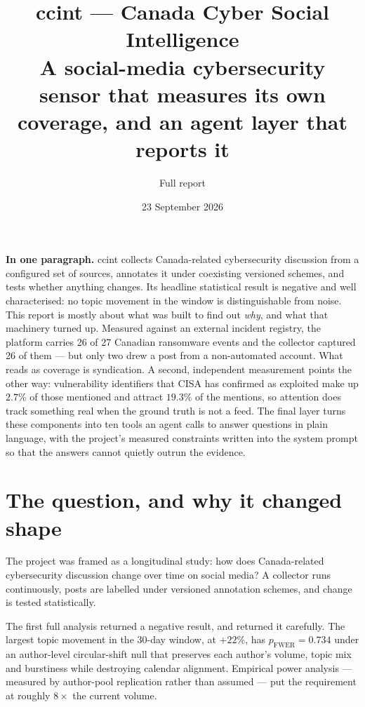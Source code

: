 \documentclass[11pt]{article}
\title{\vspace{-1.6cm}\textbf{\color{accent}ccint --- Canada Cyber Social Intelligence}\\[3pt]
\large\color{ink} A social-media cybersecurity sensor that measures its own
coverage, and an agent layer that reports it}
\author{\normalsize Full report}
\date{\normalsize 23 September 2026}
\begin{document}
\maketitle
\thispagestyle{fancy}
\vspace{-0.7cm}

\begin{keybox}
\textbf{In one paragraph.} ccint collects Canada-related cybersecurity
discussion from a configured set of sources, annotates it under coexisting
versioned schemes, and tests whether anything changes. Its headline statistical
result is negative and well characterised: no topic movement in the window is
distinguishable from noise. This report is mostly about what was built to find
out \emph{why}, and what that machinery turned up. Measured against an external
incident registry, the platform carries 26 of 27 Canadian ransomware events and
the collector captured 26 of them --- but only two drew a post from a
non-automated account. What reads as coverage is syndication. A second,
independent measurement points the other way: vulnerability identifiers that
CISA has confirmed as exploited make up $2.7\%$ of those mentioned and attract
$19.3\%$ of the mentions, so attention does track something real when the
ground truth is not a feed. The final layer turns these components into ten
tools an agent calls to answer questions in plain language, with the project's
measured constraints written into the system prompt so that the answers cannot
quietly outrun the evidence.
\end{keybox}

\section{The question, and why it changed shape}

The project was framed as a longitudinal study: how does Canada-related
cybersecurity discussion change over time on social media? A collector runs
continuously, posts are labelled under versioned annotation schemes, and change
is tested statistically.

The first full analysis returned a negative result, and returned it carefully.
The largest topic movement in the 30-day window,  at
$+22\%$, has $p_{\mathrm{FWER}} = 0.734$ under an author-level circular-shift
null that preserves each author's volume, topic mix and burstiness while
destroying calendar alignment. Empirical power analysis --- measured by
author-pool replication rather than assumed --- put the requirement at roughly
$8\times$ the current volume.
\end{document}
